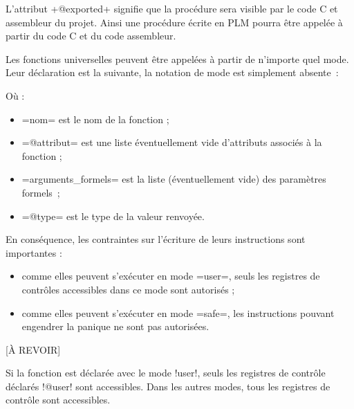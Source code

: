 L'attribut \plm+@exported+ signifie que la procédure sera visible par le code C et assembleur du projet. Ainsi une procédure écrite en PLM pourra être appelée à partir du code C et du code assembleur.







Les fonctions universelles peuvent être appelées à partir de n'importe quel mode. Leur déclaration est la suivante, la notation de mode est simplement absente~:

Où :
\begin{itemize}
  \item \plm=nom= est le nom de la fonction ;
  \item \plm=@attribut= est une liste éventuellement vide d'attributs associés à la fonction ;
  \item \plm=arguments_formels= est la liste (éventuellement vide) des paramètres formels~;
  \item \plm=@type= est le type de la valeur renvoyée.
\end{itemize}

En conséquence, les contraintes sur l'écriture de leurs instructions sont importantes :
\begin{itemize}
  \item comme elles peuvent s'exécuter en mode \plm=user=, seuls les registres de contrôles accessibles dans ce mode sont autorisés ;
  \item comme elles peuvent s'exécuter en mode \plm=safe=, les instructions pouvant engendrer la panique ne sont pas autorisées.
\end{itemize}














[À REVOIR]

Si la fonction est déclarée avec le mode \plm!user!, seuls les registres de contrôle déclarés \plm!@user! sont accessibles. Dans les autres modes, tous les registres de contrôle sont accessibles.


